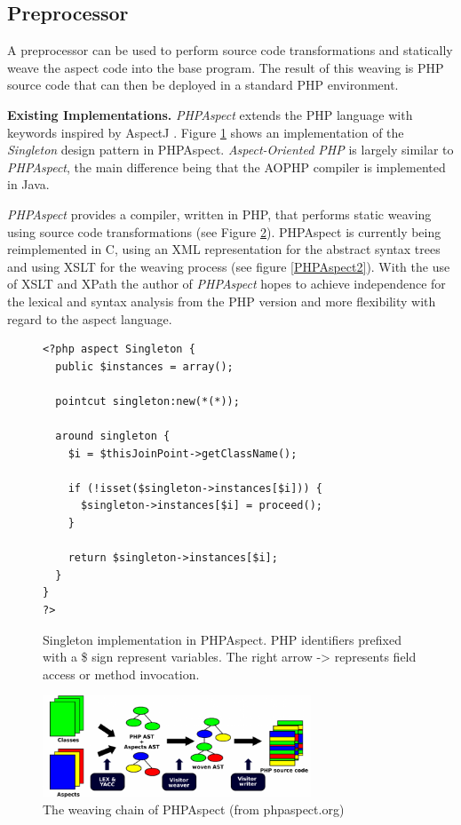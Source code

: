 \documentclass{acm_proc_article-sp}
\begin{document}
\subsection{Preprocessor}
A preprocessor can be used to perform source code transformations and
statically weave the aspect code into the base program. The result of this
weaving is PHP source code that can then be deployed in a standard PHP
environment.

\textbf{Existing Implementations. } %
\emph{PHPAspect} \cite{PHPAspect} extends the PHP language with
keywords inspired by AspectJ \cite{gk01}. Figure \ref{Singleton}
shows an implementation of the \emph{Singleton} design pattern
\cite{gof95} in PHPAspect. \emph{Aspect-Oriented PHP} \cite{AOPHP}
is largely similar to \emph{PHPAspect}, the main difference being
that the AOPHP compiler is implemented in Java.

\emph{PHPAspect} provides a compiler, written in PHP, that
performs static weaving using source code transformations (see
Figure \ref{PHPAspect}). PHPAspect is currently being
reimplemented in C, using an XML representation for the abstract
syntax trees and using XSLT for the weaving process (see figure
\ref{PHPAspect2}). With the use of XSLT and XPath the author of
\emph{PHPAspect} hopes to achieve independence for the lexical and
syntax analysis from the PHP version and more flexibility with
regard to the aspect language.

\begin{figure}[hbt]
\centering \small{\begin{verbatim}
<?php aspect Singleton {
  public $instances = array();

  pointcut singleton:new(*(*));

  around singleton {
    $i = $thisJoinPoint->getClassName();

    if (!isset($singleton->instances[$i])) {
      $singleton->instances[$i] = proceed();
    }

    return $singleton->instances[$i];
  }
}
?>
\end{verbatim}}
\caption{Singleton implementation in PHPAspect. PHP identifiers
prefixed with a \$ sign represent variables. The right arrow ->
represents field access or method invocation.} \label{Singleton}
\end{figure}

\begin{figure}
\centering
\includegraphics[width=8cm]{phpaspect_weaving}
\caption{The weaving chain of PHPAspect (from phpaspect.org)}
\label{PHPAspect}
\end{figure}
\end{document}
